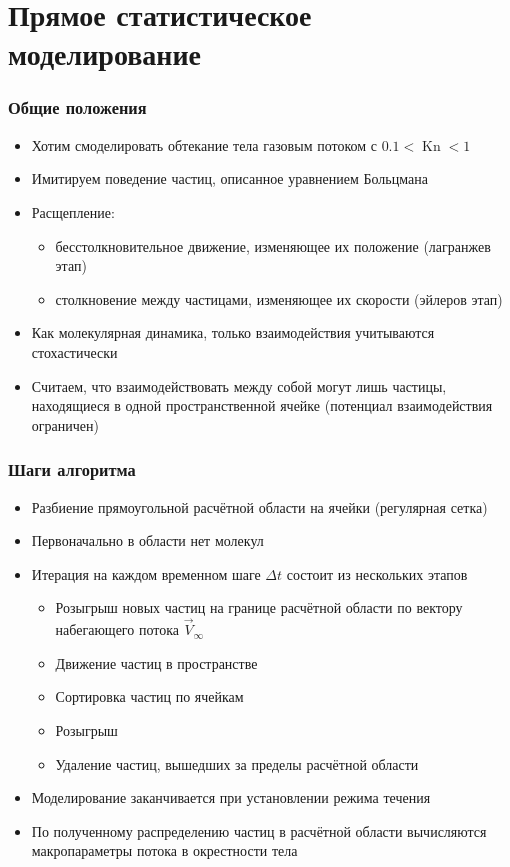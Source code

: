 \documentclass[onlymath]{beamer}
\DeclareMathOperator\Kn{Kn}
\begin{document}
\section{Прямое статистическое моделирование}
\begin{frame}
  \frametitle{Общие положения}
  \begin{itemize}
  \item Хотим смоделировать обтекание тела газовым потоком с $0.1 <
    \Kn < 1$
  \item Имитируем поведение частиц, описанное уравнением Больцмана
  \item Расщепление:
    \begin{itemize}
      \item бесстолкновительное движение, изменяющее их положение (лагранжев этап)
      \item столкновение между частицами, изменяющее их скорости (эйлеров этап)
    \end{itemize}
  \item Как молекулярная динамика, только взаимодействия учитываются
    стохастически
  \item Считаем, что взаимодействовать между собой могут лишь частицы,
    находящиеся в одной пространственной ячейке (потенциал
    взаимодействия ограничен)
  \end{itemize}
\end{frame}

\begin{frame}
  \frametitle{Шаги алгоритма}
  \begin{itemize}
  \item Разбиение прямоугольной расчётной области на ячейки (регулярная
    сетка)
  \item Первоначально в области нет молекул
  \item Итерация на каждом временном шаге $\Delta t$ состоит из
    нескольких этапов
    \begin{itemize}
    \item Розыгрыш новых частиц на границе расчётной области по
      вектору набегающего потока $\vec{V}_\infty$
    \item Движение частиц в пространстве
    \item Сортировка частиц по ячейкам
    \item Розыгрыш 
    \item Удаление частиц, вышедших за пределы расчётной области
    \end{itemize}
  \item Моделирование заканчивается при установлении режима течения
  \item По полученному распределению частиц в расчётной области
    вычисляются макропараметры потока в окрестности тела
  \end{itemize}
\end{frame}
\end{document}
